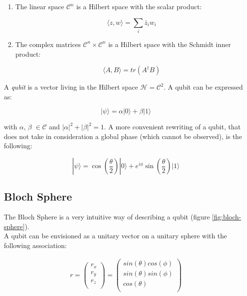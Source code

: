 \begin{enumerate}
    \item The linear space $\mathcal{C}^n$ is a Hilbert space with the scalar product:

\begin{equation}
    \langle z , w \rangle = \sum_i \bar{z}_i w_i
\end{equation}

    \item The complex matrices $\mathcal{C}^n \times \mathcal{C}^n$ is a Hilbert space with the Schmidt inner product:

\begin{equation}
    \langle A , B \rangle = tr(A^{\dagger}B)
\end{equation}

\end{enumerate}

A \textit{qubit} is a vector living in the Hilbert space $\mathcal{H} = \mathcal{C}^2$.
A qubit can be expressed as:

\begin{equation}
    |\psi \rangle = \alpha |0 \rangle +  \beta |1 \rangle
\end{equation}

with $\alpha$, $\beta$ $\in \mathcal{C}$ and $|\alpha|^2 + |\beta|^2 = 1$.
A more convenient rewriting of a qubit, that does not take in consideration a global phase (which cannot be observed), is the following:

\begin{equation}
    |\psi \rangle = \cos(\frac{\theta}{2}) |0 \rangle +  e^{i \phi} \sin(\frac{\theta}{2}) |1 \rangle
\end{equation}


\subsection{Bloch Sphere}

The Bloch Sphere is a very intuitive way of describing a qubit (figure \ref{fig:bloch-sphere}).\\
A qubit can be envisioned as a unitary vector on a unitary sphere with the following association:

\begin{align}
    r = 
    \begin{pmatrix}
        r_x \\
        r_y \\
        r_z \\
    \end{pmatrix}
    = 
    \begin{pmatrix}
        sin(\theta)cos(\phi) \\
        sin(\theta)sin(\phi) \\
        cos(\theta) \\
    \end{pmatrix}
\end{align}

